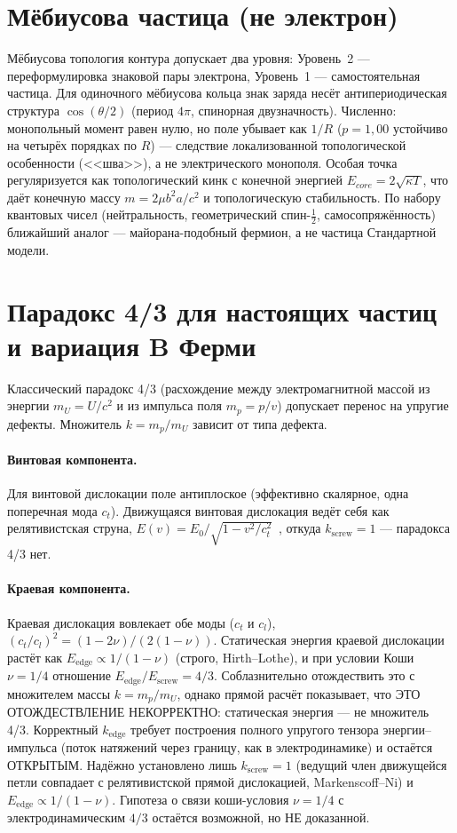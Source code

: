 \documentclass[11pt,a4paper]{article}
\begin{document}
\section{Мёбиусова частица (не электрон)}
Мёбиусова топология контура допускает два уровня: Уровень~2 ---
переформулировка знаковой пары электрона, Уровень~1 --- самостоятельная
частица. Для одиночного мёбиусова кольца знак заряда несёт
антипериодическая структура $\cos(\theta/2)$ (период $4\pi$, спинорная
двузначность). Численно: монопольный момент равен нулю, но поле убывает как
$1/R$ ($p=1{,}00$ устойчиво на четырёх порядках по $R$) --- следствие
локализованной топологической особенности (<<шва>>), а не электрического
монополя. Особая точка регуляризуется как топологический кинк с конечной
энергией $E_{core}=2\sqrt{\kappa T}$, что даёт конечную массу
$m=2\mu b^2 a/c^2$ и топологическую стабильность. По набору квантовых чисел
(нейтральность, геометрический спин-$\tfrac12$, самосопряжённость) ближайший
аналог --- майорана-подобный фермион, а не частица Стандартной модели.

\section{Парадокс 4/3 для настоящих частиц и вариация B Ферми}
\label{sec:four-thirds}

Классический парадокс 4/3 (расхождение между электромагнитной массой из
энергии $m_U=U/c^2$ и из импульса поля $m_p=p/v$) допускает перенос на
упругие дефекты. Множитель $k=m_p/m_U$ зависит от типа дефекта.

\paragraph{Винтовая компонента.} Для винтовой дислокации поле антиплоское
(эффективно скалярное, одна поперечная мода $c_t$). Движущаяся винтовая
дислокация ведёт себя как релятивистская струна,
$E(v)=E_0/\sqrt{1-v^2/c_t^2}$~\cite{Eshelby1949,HirthLothe}, откуда
$k_{\text{screw}}=1$ --- парадокса 4/3 нет.

\paragraph{Краевая компонента.} Краевая дислокация вовлекает обе моды
($c_t$ и $c_l$), $(c_t/c_l)^2=(1-2\nu)/(2(1-\nu))$. Статическая энергия краевой дислокации растёт как
$E_{\text{edge}}\propto 1/(1-\nu)$ (строго, Hirth--Lothe), и при условии Коши
$\nu=1/4$ отношение $E_{\text{edge}}/E_{\text{screw}}=4/3$. Соблазнительно
отождествить это с множителем массы $k=m_p/m_U$, однако прямой расчёт
показывает, что ЭТО ОТОЖДЕСТВЛЕНИЕ НЕКОРРЕКТНО: статическая энергия --- не
множитель 4/3. Корректный $k_{\text{edge}}$ требует построения полного
упругого тензора энергии--импульса (поток натяжений через границу, как в
электродинамике) и остаётся ОТКРЫТЫМ. Надёжно установлено лишь
$k_{\text{screw}}=1$ (ведущий член движущейся петли совпадает с
релятивистской прямой дислокацией, Markenscoff--Ni) и
$E_{\text{edge}}\propto1/(1-\nu)$. Гипотеза о связи коши-условия $\nu=1/4$ с
электродинамическим $4/3$ остаётся возможной, но НЕ доказанной.
\end{document}
